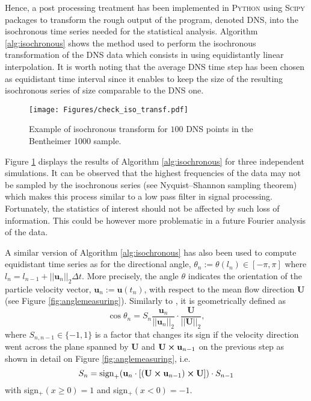 Hence, a post processing treatment has been implemented in \textsc{Python} using \textsc{Scipy} packages to transform the rough output of the program, denoted DNS, into the isochronous time series needed for the statistical analysis.
Algorithm \ref{alg:isochronous} shows the method used to perform the isochronous transformation of the DNS data which consists in using equidistantly linear interpolation.
It is worth noting that the average DNS time step has been chosen as equidistant time interval since it enables to keep the size of the resulting isochronous series of size comparable to the DNS one.\\
\begin{figure}
	\centering
	\texttt{[image: Figures/check\_iso\_transf.pdf]}
	\caption{Example of isochronous transform for $100$ DNS points in the Bentheimer 1000 sample.}
	\label{fig:checkisotransf}
\end{figure}
Figure \ref{fig:checkisotransf} displays the results of Algorithm \ref{alg:isochronous} for three independent simulations.
It can be observed that the highest frequencies of the data may not be sampled by the isochronous series (see Nyquist–Shannon sampling theorem) which makes this process similar to a low pass filter in signal processing.
Fortunately, the statistics of interest should not be affected by such loss of information. 
This could be however more problematic in a future Fourier analysis of the data.

A similar version of Algorithm \ref{alg:isochronous} has also been used to compute equidistant time series as for the directional angle, $\theta_n:=\theta(l_n)\in[-\pi,\pi]$ where $l_n = l_{n-1} + ||\textbf{u}_n||_2 \Delta t$.
More precisely, the angle $\theta$ indicates the orientation of the particle velocity vector, $\textbf{u}_n :=\textbf{u}(t_n)$, with respect to the mean flow direction $\textbf{U}$ (see Figure \ref{fig:anglemeasuring}). 
Similarly to \citet{Meyer2016}, it is geometrically defined as
\begin{equation}
\cos \theta_n = S_{n} \frac{\textbf{u}_n}{||\textbf{u}_n||_2 }\cdot \frac{\textbf{U}}{||\textbf{U}||_2},
\end{equation}
where $S_{n,n-1}\in\{-1,1\}$ is a factor that changes its sign if the velocity direction went across the plane spanned by $\textbf{U}$ and $\textbf{U}\cross\textbf{u}_{n-1}$ on the previous step as shown in detail on Figure \ref{fig:anglemeasuring}, i.e.
\begin{equation}\label{eq:theta_sign}
S_{n} = \mathrm{sign}_+(\textbf{u}_n\cdot [(\textbf{U}\cross\textbf{u}_{n-1})\cross \textbf{U}])\cdot S_{n-1} 
\end{equation}
with sign$_+(x\geq 0)=1$ and sign$_+(x< 0)=-1$.

